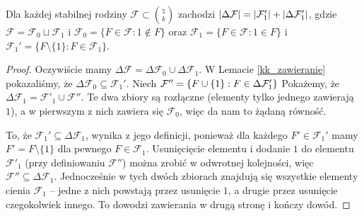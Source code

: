 \begin{lemma}
	\label{kk_suma}
	Dla każdej stabilnej rodziny \(\mathcal F\subset \binom{\natural}{k}\) zachodzi
	\(\card{\Delta\mathcal F} = \card{\mathcal F'_1} + \card{\Delta\mathcal
		F'_1}\), gdzie \(\mathcal F = \mathcal F_0 \sqcup \mathcal F_1\) i \(\mathcal F_0
	= \{F \in \mathcal F : 1 \notin F\}\) oraz \(\mathcal F_1 = \{F \in \mathcal F
	: 1 \in F\}\) i \(\mathcal F_1' = \{F \setminus \{1\} : F \in \mathcal F_1\}\).
\end{lemma}
\begin{proof}
	Oczywiście mamy \(\Delta\mathcal F = \Delta\mathcal F_0 \cup \Delta\mathcal
	F_1\). W Lemacie \ref{kk_zawieranie} pokazaliśmy, że \(\Delta\mathcal F_0
	\subseteq \mathcal F_1'\). Niech \(\mathcal F'' = \set{F\cup\set{1} :
		F\in\Delta \mathcal F'_1}\) Pokażemy, że \(\Delta\mathcal F_1 = \mathcal
	F'_1\cup \mathcal F''\). Te dwa zbiory są rozłączne (elementy tylko jednego
	zawierają \(1\)), a w pierwszym z nich zawiera się \(\mathcal F_0\), więc da nam
	to żądaną równość.

	To, że \(\mathcal F_1' \subseteq \Delta\mathcal F_1\), wynika z jego definicji,
	ponieważ dla każdego \(F' \in \mathcal F_1'\) mamy \(F' = F \setminus \{1\}\) dla
	pewnego \(F \in \mathcal F_1\). Usunięcięcie elementu i dodanie \(1\) do elementu
	\(\mathcal F'_1\) (przy definiowaniu \(\mathcal F''\)) można zrobić w odwrotnej
	kolejności, więc \(\mathcal F''\subseteq \Delta\mathcal F_1\). Jednocześnie w
	tych dwóch zbiorach znajdują się wszystkie elementy cienia \(\mathcal F_1\) --
	jedne z nich powstają przez usunięcie \(1\), a drugie przez usunięcie
	czegokolwiek innego. To dowodzi zawierania w drugą stronę i kończy dowód.
\end{proof}

